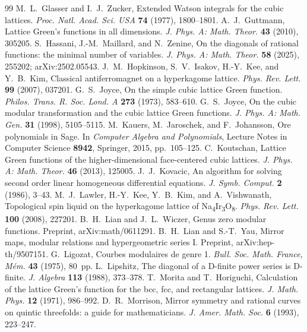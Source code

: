 \documentclass[cntp]{ipart}
\theoremstyle{plain}
\theoremstyle{remark}
\begin{document}
\begin{thebibliography}{99}
 M.~L.~Glasser and I.~J.~Zucker, Extended Watson integrals for the cubic lattices. \textit{Proc. Natl. Acad. Sci. USA} \textbf{74} (1977), 1800--1801.
 A.~J.~Guttmann, Lattice Green's functions in all dimensions. \textit{J. Phys. A: Math. Theor.} \textbf{43} (2010), 305205.
 S.~Hassani, J.-M.~Maillard, and N.~Zenine, On the diagonals of rational functions: the minimal number of variables. \textit{J. Phys. A: Math. Theor.} \textbf{58} (2025), 255202; arXiv:2502.05543.
 J.~M.~Hopkinson, S.~V.~Isakov, H.-Y.~Kee, and Y.~B.~Kim, Classical antiferromagnet on a hyperkagome lattice. \textit{Phys. Rev. Lett.} \textbf{99} (2007), 037201.
 G.~S.~Joyce, On the simple cubic lattice Green function. \textit{Philos. Trans. R. Soc. Lond. A} \textbf{273} (1973), 583--610.
 G.~S.~Joyce, On the cubic modular transformation and the cubic lattice Green functions. \textit{J. Phys. A: Math. Gen.} \textbf{31} (1998), 5105--5115.
 M.~Kauers, M.~Jaroschek, and F.~Johansson, Ore polynomials in Sage. In \textit{Computer Algebra and Polynomials}, Lecture Notes in Computer Science \textbf{8942}, Springer, 2015, pp.~105--125.
 C.~Koutschan, Lattice Green functions of the higher-dimensional face-centered cubic lattices. \textit{J. Phys. A: Math. Theor.} \textbf{46} (2013), 125005.
 J.~J.~Kovacic, An algorithm for solving second order linear homogeneous differential equations. \textit{J. Symb. Comput.} \textbf{2} (1986), 3--43.
 M.~J.~Lawler, H.-Y.~Kee, Y.~B.~Kim, and A.~Vishwanath, Topological spin liquid on the hyperkagome lattice of Na\textsubscript{4}Ir\textsubscript{3}O\textsubscript{8}. \textit{Phys. Rev. Lett.} \textbf{100} (2008), 227201.
 B.~H.~Lian and J.~L.~Wiczer, Genus zero modular functions. Preprint, arXiv:math/0611291.
 B.~H.~Lian and S.-T.~Yau, Mirror maps, modular relations and hypergeometric series I. Preprint, arXiv:hep-th/9507151.
 G.~Ligozat, Courbes modulaires de genre 1. \textit{Bull. Soc. Math. France, M\'em.} \textbf{43} (1975), 80~pp.
 L.~Lipshitz, The diagonal of a D-finite power series is D-finite. \textit{J. Algebra} \textbf{113} (1988), 373--378.
 T.~Morita and T.~Horiguchi, Calculation of the lattice Green's function for the bcc, fcc, and rectangular lattices. \textit{J. Math. Phys.} \textbf{12} (1971), 986--992.
 D.~R.~Morrison, Mirror symmetry and rational curves on quintic threefolds: a guide for mathematicians. \textit{J. Amer. Math. Soc.} \textbf{6} (1993), 223--247.

\end{thebibliography}
\end{document}
